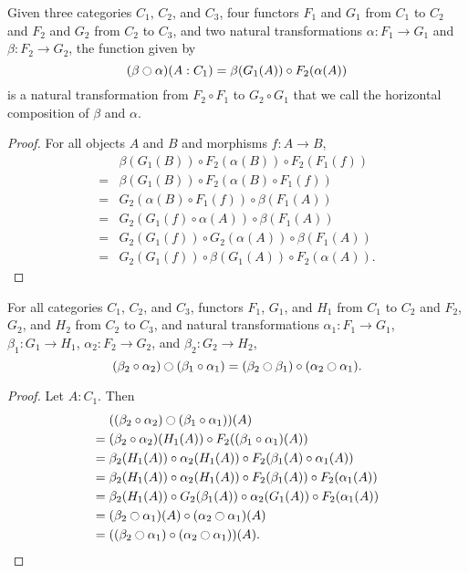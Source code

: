 \documentclass[../math.tex]{subfiles}
\begin{document}
\begin{theorem}
    Given three categories $C_1$, $C_2$, and $C_3$, four functors $F_1$ and
    $G_1$ from $C_1$ to $C_2$ and $F_2$ and $G_2$ from $C_2$ to $C_3$, and two
    natural transformations $\alpha : F_1 \to G_1$ and $\beta : F_2 \to G_2$,
    the function given by \[
        (\beta \ocircle \alpha)(A : C_1) = \beta(G_1(A)) \circ F_2(\alpha(A))
    \]
    is a natural transformation from $F_2 \circ F_1$ to $G_2 \circ G_1$ that we
    call the horizontal composition of $\beta$ and $\alpha$.
\end{theorem}
\begin{proof}
    For all objects $A$ and $B$ and morphisms $f : A \to B$,
    \begin{align*}
         {}& \beta(G_1(B)) \circ F_2(\alpha(B)) \circ F_2(F_1(f)) \\
        ={}& \beta(G_1(B)) \circ F_2(\alpha(B) \circ F_1(f)) \\
        ={}& G_2(\alpha(B) \circ F_1(f)) \circ \beta(F_1(A)) \\
        ={}& G_2(G_1(f) \circ \alpha(A)) \circ \beta(F_1(A)) \\
        ={}& G_2(G_1(f)) \circ G_2(\alpha(A)) \circ \beta(F_1(A)) \\
        ={}& G_2(G_1(f)) \circ \beta(G_1(A)) \circ F_2(\alpha(A)).
    \end{align*}
\end{proof}

\begin{theorem} \label{nat_trans_interchange}
    For all categories $C_1$, $C_2$, and $C_3$, functors $F_1$, $G_1$, and $H_1$
    from $C_1$ to $C_2$ and $F_2$, $G_2$, and $H_2$ from $C_2$ to $C_3$, and
    natural transformations $\alpha_1 : F_1 \to G_1$, $\beta_1 : G_1 \to H_1$,
    $\alpha_2 : F_2 \to G_2$, and $\beta_2 : G_2 \to H_2$,
    \[
        (\beta_2 \circ \alpha_2) \ocircle (\beta_1 \circ \alpha_1) =
        (\beta_2 \ocircle \beta_1) \circ (\alpha_2 \ocircle \alpha_1).
    \]
\end{theorem}
\begin{proof}
    Let $A : C_1$.  Then
    \begin{align*}
         {}& ((\beta_2 \circ \alpha_2) \ocircle (\beta_1 \circ \alpha_1))(A) \\
        ={}& (\beta_2 \circ \alpha_2)(H_1(A))
            \circ F_2((\beta_1 \circ \alpha_1)(A)) \\
        ={}& \beta_2(H_1(A)) \circ \alpha_2(H_1(A))
            \circ F_2(\beta_1(A) \circ \alpha_1(A)) \\
        ={}& \beta_2(H_1(A)) \circ \alpha_2(H_1(A))
            \circ F_2(\beta_1(A)) \circ F_2(\alpha_1(A)) \\
        ={}& \beta_2(H_1(A)) \circ G_2(\beta_1(A))
            \circ \alpha_2(G_1(A)) \circ F_2(\alpha_1(A)) \\
        ={}& (\beta_2 \ocircle \alpha_1)(A)
            \circ (\alpha_2 \ocircle \alpha_1)(A) \\
        ={}& ((\beta_2 \ocircle \alpha_1)
            \circ (\alpha_2 \ocircle \alpha_1))(A).
    \end{align*}
\end{proof}
\end{document}
